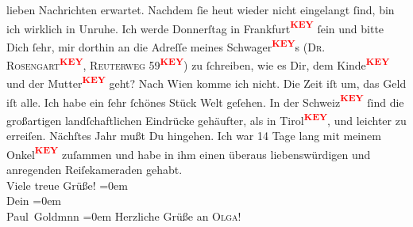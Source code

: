 \begin{ledgroupsized}[t]{13cm}
                    lieben Nachrichten erwartet. Nachdem ſie heut wieder nicht
                    eingelangt ſind, bin ich wirklich in Unruhe. Ich werde Donnerſtag
                    in Frankfurt\textcolor{red}{\textsuperscript{\textbf{KEY}}} ſein und bitte Dich ſehr, mir dorthin
                    an die Adreſſe meines Schwager\textcolor{red}{\textsuperscript{\textbf{KEY}}}s (\textsc{Dr. Rosengart\textcolor{red}{\textsuperscript{\textbf{KEY}}}}, \textsc{Reuterweg} 59\textcolor{red}{\textsuperscript{\textbf{KEY}}}) zu ſchreiben, wie es Dir, dem
                        Kinde\textcolor{red}{\textsuperscript{\textbf{KEY}}} und der Mutter\textcolor{red}{\textsuperscript{\textbf{KEY}}} geht? {\pb}\pend
           \pstart
           Nach Wien komme ich nicht. Die Zeit iſt
                    um, das Geld iſt alle. Ich habe ein ſehr ſchönes Stück Welt geſehen. In der Schweiz\textcolor{red}{\textsuperscript{\textbf{KEY}}} ſind die großartigen landſchaftlichen
                    Eindrücke gehäufter, als in Tirol\textcolor{red}{\textsuperscript{\textbf{KEY}}}, und leichter zu
                    erreiſen. Nächſtes Jahr mußt Du hingehen. Ich war  14 Tage lang mit meinem Onkel\textcolor{red}{\textsuperscript{\textbf{KEY}}}
                    zuſammen und habe in ihm einen überaus liebenswürdigen und anregenden
                    Reiſekameraden gehabt. {\\[\baselineskip]}Viele treue Grüße!\pend
           \leftskip=0em{}\pstart
           {\\[\baselineskip]}Dein\pend
           \leftskip=0em{}\pstart
           {\\[\baselineskip]}\spacefill\mbox{Paul Goldmnn}\pend
           \leftskip=0em{}\pstart
           Herzliche Grüße an \textsc{Olga}! \pend
           
         
         \endnumbering{}\end{ledgroupsized}\begin{anhang}\end{anhang}\newcommand{\dateiname}{L03222}\newcommand{\titel}{Paul Goldmann an Arthur Schnitzler, 1. 9. [1902]}\newcommand{\editorInnen}{Martin Anton Müller und Laura Untner}
      